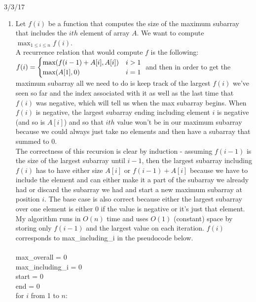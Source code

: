 \documentclass{article}
\begin{document}
	
 \hspace{5.5in} 3/3/17\\

\begin{enumerate}
	\item Let $f(i)$ be a function that computes the size of the maximum subarray that includes the $ith$ element of array $A$.  We want to compute $\displaystyle\max_{1 \leq i \leq n}f(i)$.  \\
	A recurrence relation that would compute $f$ is the following: \\
	$f(i) = 
	\begin{cases}
		\textup{max}(f(i-1) + A[i], A[i]) & i > 1\\
		\textup{max}(A[1], 0) & i = 1 \\
	\end{cases} \\
	$ and then in order to get the maximum subarray all we need to do is keep track of the largest $f(i)$ we've seen so far and the index associated with it as well as the last time that $f(i)$ was negative, which will tell us when the max subarray begins.  When $f(i)$ is negative, the largest subarray ending including element $i$ is negative (and so is $A[i]$) and so that $ith$ value won't be in our maximum subarray because we could always just take no elements and then have a subarray that summed to 0.  \\
	The correctness of this recursion is clear by induction - assuming $f(i-1)$ is the size of the largest subarray until $i-1$, then the largest subarray including $f(i)$ has to have either size $A[i]$ or $f(i-1) + A[i]$ because we have to include the element and can either make it a part of the subarray we already had or discard the subarray we had and start a new maximum subarray at position $i$.  The base case is also correct because either the largest subarray over one element is either 0 if the value is negative or it's just that element.  My algorithm runs in $O(n)$ time and uses $O(1)$ (constant) space by storing only $f(i-1)$ and the largest value on each iteration.  $f(i)$ corresponds to max\_including\_i in the pseudocode below.  \\\\
	max\_overall = 0 \\
	max\_including\_i = 0 \\
	start = 0 \\
	end = 0 \\
	for $i$ from 1 to $n$: \\

\end{enumerate}
\end{document}
